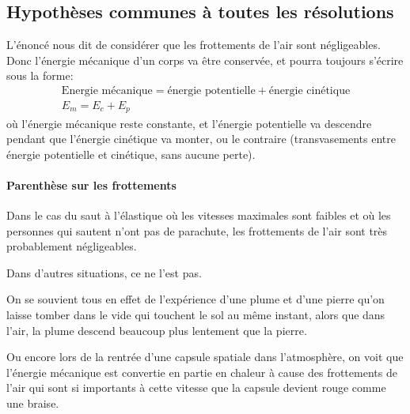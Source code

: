 \subsection{Hypothèses communes à toutes les résolutions}
L'énoncé nous dit de considérer que les frottements de l'air sont négligeables. 
Donc l'énergie mécanique d'un corps va être conservée, et pourra toujours s'écrire sous la forme:
\begin{gather*}
    \text{Energie mécanique} = \text{énergie potentielle} + \text{énergie cinétique} \\
    E_m = E_c + E_p
\end{gather*}
où l'énergie mécanique reste constante, et l'énergie potentielle va descendre pendant que l'énergie cinétique va monter, ou le contraire (transvasements entre énergie potentielle et cinétique, sans aucune perte).

\paragraph{Parenthèse sur les frottements}
Dans le cas du saut à l'élastique où les vitesses maximales sont faibles et où les personnes qui sautent n'ont pas de parachute, les frottements de l'air sont très probablement négligeables. 

Dans d'autres situations, ce ne l'est pas.

On se souvient tous en effet de l'expérience d'une plume et d'une pierre qu'on laisse tomber dans le vide qui touchent le sol au même instant, alors que dans l'air, la plume descend beaucoup plus lentement que la pierre.

Ou encore lors de la rentrée d'une capsule spatiale dans l'atmosphère, on voit que l'énergie mécanique est convertie en partie en chaleur à cause des frottements de l'air qui sont si importants à cette vitesse que la capsule devient rouge comme une braise.